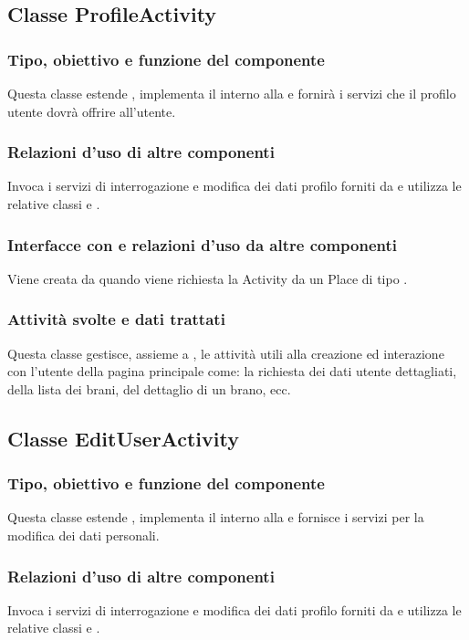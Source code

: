 \subsection{Classe ProfileActivity}
\subsubsection*{Tipo, obiettivo e funzione del componente}
Questa classe estende , implementa il 
interno alla  e fornir\`a i servizi
che il profilo utente dovr\`a offrire all'utente.
\subsubsection*{Relazioni d'uso di altre componenti}
Invoca i servizi di interrogazione e modifica dei dati profilo forniti da
 e utilizza le relative classi  e
.
\subsubsection*{Interfacce con e relazioni d'uso da altre componenti}
Viene creata da  quando viene richiesta la Activity da
un Place di tipo .
\subsubsection*{Attivit\`a svolte e dati trattati}
Questa classe gestisce, assieme a , le attivit\`a utili alla
creazione ed interazione con l'utente della pagina principale come: la
richiesta dei dati utente dettagliati, della lista dei brani, del dettaglio di
un brano, ecc.

\subsection{Classe EditUserActivity}
\subsubsection*{Tipo, obiettivo e funzione del componente}
Questa classe estende , implementa il 
interno alla  e fornisce i servizi per la modifica dei dati
personali.
\subsubsection*{Relazioni d'uso di altre componenti}
Invoca i servizi di interrogazione e modifica dei dati profilo forniti da
 e utilizza le relative classi  e
.
